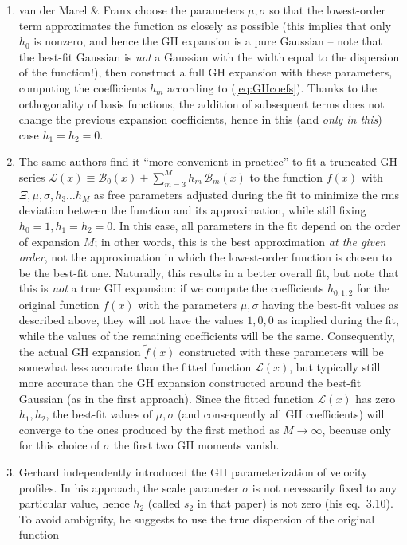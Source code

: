 \documentclass[12pt]{article}
\begin{document}
\begin{enumerate}
\item van der Marel \& Franx \cite{vdMarelFranx1993} choose the parameters $\mu, \sigma$ so that the lowest-order term approximates the function as closely as possible (this implies that only $h_0$ is nonzero, and hence the GH expansion is a pure Gaussian -- note that the best-fit Gaussian is \textit{not} a Gaussian with the width equal to the dispersion of the function!), then construct a full GH expansion with these parameters, computing the coefficients $h_m$ according to (\ref{eq:GHcoefs}). Thanks to the orthogonality of basis functions, the addition of subsequent terms does not change the previous expansion coefficients, hence in this (and \textit{only in this}) case $h_1=h_2=0$.
\item The same authors find it ``more convenient in practice'' to fit a truncated GH series $\mathscr L(x) \equiv \mathcal B_0(x) + \sum_{m=3}^M h_m\,\mathcal B_m(x)$ to the function $f(x)$ with $\Xi, \mu, \sigma, h_3 \dots h_M$ as free parameters adjusted during the fit to minimize the rms deviation between the function and its approximation, while still fixing $h_0=1, h_1=h_2=0$.
In this case, all parameters in the fit depend on the order of expansion $M$; in other words, this is the best approximation \textit{at the given order}, not the approximation in which the lowest-order function is chosen to be the best-fit one. Naturally, this results in a better overall fit, but note that this is \textit{not} a true GH expansion: if we compute the coefficients $h_{0,1,2}$ for the original function $f(x)$ with the parameters $\mu,\sigma$ having the best-fit values as described above, they will not have the values $1,0,0$ as implied during the fit, while the values of the remaining coefficients will be the same. Consequently, the actual GH expansion $\tilde f(x)$ constructed with these parameters will be somewhat less accurate than the fitted function $\mathscr L(x)$, but typically still more accurate than the GH expansion constructed around the best-fit Gaussian (as in the first approach). 
Since the fitted function $\mathscr L(x)$ has zero $h_1,h_2$, the best-fit values of $\mu,\sigma$ (and consequently all GH coefficients) will converge to the ones produced by the first method as $M \to \infty$, because only for this choice of $\sigma$ the first two GH moments vanish.
\item Gerhard \cite{Gerhard1993} independently introduced the GH parameterization of velocity profiles. In his approach, the scale parameter $\sigma$ is not necessarily fixed to any particular value, hence $h_2$ (called $s_2$ in that paper) is not zero (his eq.~3.10). To avoid ambiguity, he suggests to use the true dispersion of the original function%

\end{enumerate}
\end{document}
